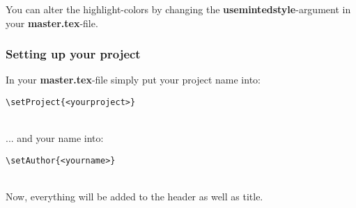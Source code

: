 You can alter the highlight-colors by changing the \textbf{usemintedstyle{}}-argument in your \textbf{master.tex}-file.

\subsubsection{Setting up your project}
In your \textbf{master.tex}-file simply put your project name into: \\
 \begin{verbatim}\setProject{<yourproject>}\end{verbatim} \\
 ... and your name into: \\
 \begin{verbatim}\setAuthor{<yourname>}\end{verbatim} \\
Now, everything will be added to the header as well as title. \\




